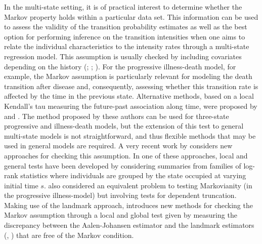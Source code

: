 In the multi-state setting, it is of practical interest to determine whether the Markov property holds within a particular data set. This information can be used to assess the validity of the transition probability estimates as well as the best option for performing inference on the transition intensities when one aims to relate the individual characteristics to the intensity rates through a multi-state regression model. This assumption is usually checked by including covariates depending on the history (\citealp{Kay1986}; \citealp{Andersen2000}; \citealp{Andersen2002}). For the progressive illness-death model, for example, the Markov assumption is particularly relevant for modeling the death transition after disease and, consequently, assessing whether this transition rate is affected by the time in the previous state. Alternative methods, based on a local Kendall's tau measuring the future-past association along time, were proposed by \citet{Girondo2012} and \citet{Girondo2016}. The method proposed by these authors can be used for three-state progressive and illness-death models, but the extension of this test to general multi-state models is not straightforward, and thus flexible methods that may be used in general models are required. A very recent work by \citet{Titman2020} considers new approaches for checking this assumption. In one of these approaches, local and general tests have been developed by considering summaries from families of log-rank statistics where individuals are grouped by the state occupied at varying initial time $s$. \citet{Chiou2018} also considered an equivalent problem to testing Markovianity (in the progressive illness-model) but involving tests for dependent truncation. Making use of the landmark approach, \citet{soutinho_machado2020} introduces new methods for checking the Markov assumption through a local and global test given by measuring the discrepancy between the Aalen-Johansen estimator and the landmark estimators (\citealp{AlvarezMM2015}, \citealp{PutterSpitoni2018}) that are free of the Markov condition.

